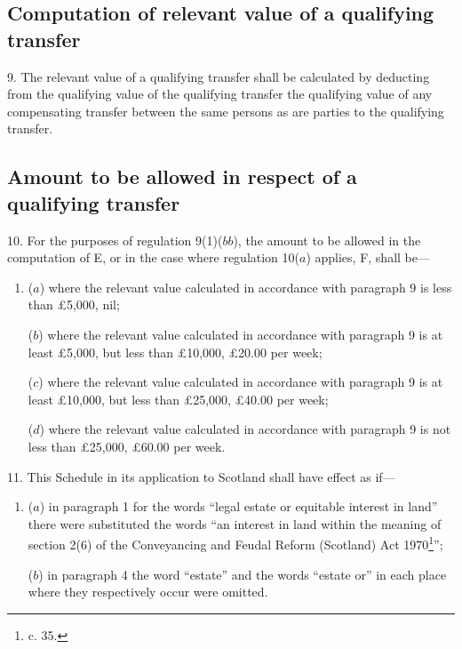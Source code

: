 \documentclass[a4paper]{article}
\begin{document}
\subsection*{Computation of relevant value of a qualifying transfer}

9.  The relevant value of a qualifying transfer shall be calculated by deducting from the qualifying value of the qualifying transfer the qualifying value of any compensating transfer between the same persons as are parties to the qualifying transfer.

\subsection*{Amount to be allowed in respect of a qualifying transfer}

10.  For the purposes of regulation 9(1)($bb$), the amount to be allowed in the computation of E, or in the case where regulation 10($a$) applies, F, shall be—
\begin{enumerate}\item[]
($a$) where the relevant value calculated in accordance with paragraph 9 is less than £5,000, nil;

($b$) where the relevant value calculated in accordance with paragraph 9 is at least £5,000, but less than £10,000, £20.00 per week;

($c$) where the relevant value calculated in accordance with paragraph 9 is at least £10,000, but less than £25,000, £40.00 per week;

($d$) where the relevant value calculated in accordance with paragraph 9 is not less than £25,000, £60.00 per week.
\end{enumerate}

\medskip

11.  This Schedule in its application to Scotland shall have effect as if—
\begin{enumerate}\item[]
($a$) in paragraph 1 for the words “legal estate or equitable interest in land” there were substituted the words “an interest in land within the meaning of section 2(6) of the Conveyancing and Feudal Reform (Scotland) Act 1970\footnote{ c. 35.}”;

($b$) in paragraph 4 the word “estate” and the words “estate or” in each place where they respectively occur were omitted.
\end{enumerate}

\end{document}
